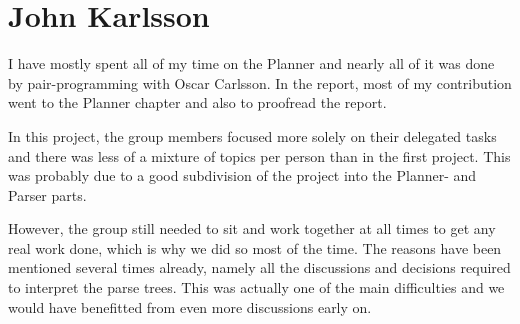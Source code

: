 \section*{John Karlsson}

I have mostly spent all of my time on the Planner and nearly all of it was done
by pair-programming with Oscar Carlsson. In the report, most of my contribution
went to the Planner chapter and also to proofread the report.

In this project, the group members focused more solely on their delegated tasks
and there was less of a mixture of topics per person than in the first project.
This was probably due to a good subdivision of the project into the Planner- and
Parser parts.

However, the group still needed to sit and work together at all times to get any
real work done, which is why we did so most of the time. The reasons have been
mentioned several times already, namely all the discussions and decisions
required to interpret the parse trees. This was actually one of the main
difficulties and we would have benefitted from even more discussions early on.
